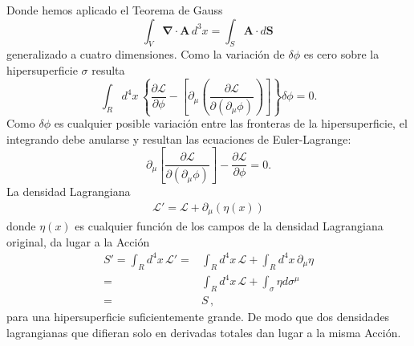 Donde hemos aplicado el Teorema de Gauss
\begin{equation}
\int_V\boldsymbol{\nabla}\cdot\mathbf{A}\,d^3x=
 \int_S\mathbf{A}\cdot d\mathbf{S}\,
\end{equation}
generalizado a cuatro dimensiones. Como la variaci\'on de $\delta\phi$ es cero sobre la hipersuperficie $\sigma$ resulta 
\begin{equation}
  \int_{R}d^4x\,
  \left\{ 
    \frac{\partial\mathcal{L}}{\partial\phi}-
   \left[\partial_\mu\left(
      \frac{\partial\mathcal{L}}{\partial(\partial_\mu\phi)}
    \right)\right]
  \right\}\delta\phi=0.
\end{equation}
Como $\delta\phi$ es cualquier posible variaci\'on entre las fronteras de la hipersuperficie, el integrando debe anularse y resultan las ecuaciones de Euler-Lagrange:
\begin{equation}
\label{eq:eelcallfmu}
 \partial_\mu
  \left[
    \frac{\partial\mathcal{L}}{\partial
      (\partial_\mu\phi)}
  \right]-\frac{\partial\mathcal{L}}{\partial\phi}=0.
\end{equation}
La densidad Lagrangiana
\begin{align}
  \mathcal{L}'=\mathcal{L}+\partial_\mu(\eta(x))
\end{align}
donde $\eta(x)$ es cualquier funci\'on de los campos de la densidad Lagrangiana original, da lugar a la Acci\'on
\begin{align}
  S'=\int_{R}d^4x\,\mathcal{L}'=&\int_{R}d^4x\,\mathcal{L}+\int_R d^4x\,\partial_\mu\eta\nonumber\\
  =&\int_{R}d^4x\,\mathcal{L}+\int_\sigma \eta d\sigma^\mu\nonumber\\
  =&S\,,
\end{align}
para una hipersuperficie suficientemente grande. De modo que dos densidades lagrangianas que difieran solo en derivadas totales dan lugar a la misma Acci\'on.

